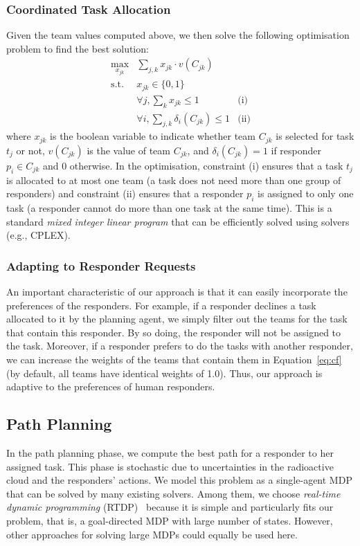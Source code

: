 \subsubsection{Coordinated Task Allocation}
Given the team values computed above, we then solve the following
optimisation problem to find the best solution:
\begin{equation}
  \begin{array}{lll}
    \max\limits_{x_{jk}} & \sum_{j, k} x_{jk} \cdot v(C_{jk}) & \\[2pt]
    \mbox{s.t.} & x_{jk} \in \{0, 1\} & \\[2pt]
    & \forall j, \sum_{k} x_{jk} \leq 1 & \mbox{(i)} \\[2pt]
    & \forall i, \sum_{j, k} \delta_i(C_{jk}) \leq 1 & \mbox{(ii)}
  \end{array}
  \label{eq:cf}
\end{equation}
where $x_{jk}$ is the boolean variable to indicate whether team
$C_{jk}$ is selected for task $t_j$ or not, $v(C_{jk})$ is the
value of team $C_{jk}$, and $\delta_i(C_{jk}) = 1$ if responder
$p_i\in C_{jk}$ and 0 otherwise. In the optimisation, constraint
(i) ensures that a task $t_j$ is allocated to at most one team (a
task does not need more than one group of responders) and
constraint (ii) ensures that a responder $p_i$ is assigned to only
one task (a responder cannot do more than one task at the same
time). This is a standard {\em mixed integer linear program} that
can be efficiently solved using solvers (e.g., CPLEX).

\subsubsection{Adapting to Responder Requests}\label{sec:adaptive}
An important characteristic of our approach is that it can easily
incorporate the preferences of the responders. For example, if a
responder declines a task allocated to it by the planning agent, we
simply filter out the teams for the task that contain this
responder. By so doing, the responder will not be assigned to the
task. Moreover, if a responder prefers to do the tasks with another
responder, we can increase the weights of the teams that contain
them in Equation~\ref{eq:cf} (by default, all teams have identical
weights of 1.0). Thus, our approach is adaptive to the
 preferences of human responders.\vspace{-2mm}

\subsection{Path Planning}
\label{sec:pathplanning}
In the path planning phase, we compute the best path for a
responder to her assigned task. This phase is stochastic due to uncertainties in the radioactive cloud and the responders'
actions. We model this problem as a single-agent MDP that can be
solved by many existing solvers. Among them, we choose {\em
real-time dynamic programming} (RTDP)~\cite{barto1995learning}
because it is simple and particularly fits our problem, that is, a
goal-directed MDP with large number of states. However, other
approaches for solving large MDPs  could equally be used here.


